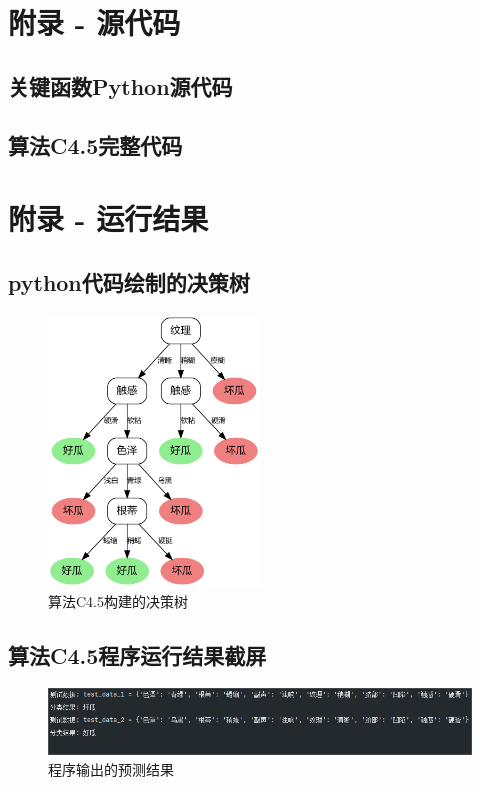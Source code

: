 \documentclass[a4paper,UTF8]{article}
\numberwithin{equation}{section}
\theoremstyle{definition}
\begin{document}
\clearpage

\appendix
\section{附录 - 源代码}
    \subsection{关键函数Python源代码}
    \label{appendix:func_code}
    
    
    
    
    \subsection{算法C4.5完整代码}
    \label{appendix:C45_code}
    

\section{附录 - 运行结果}
    \subsection{python代码绘制的决策树}
    \label{fig:C45_decision_tree}
    \begin{figure}[H]
    \centering
    \includegraphics[width=0.5\textwidth]{lab2/fig/decision_tree_C45.png}
    \caption{算法C4.5构建的决策树}
    \end{figure}

    \subsection{算法C4.5程序运行结果截屏}
    \label{fig:C45_result_screenshot}
    \begin{figure}[H]
    \centering
    \includegraphics[scale=0.55]{lab2/fig/run_result.png}
    \caption{程序输出的预测结果}
    \end{figure}
\end{document}
